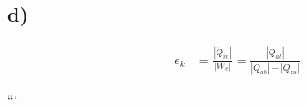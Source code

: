 

\subsection*{d)}
\begin{align*}
\epsilon_k &= \frac{\left| \dot{Q}_{in} \right|}{\left| W_e \right|} = \frac{\left| \dot{Q}_{ab} \right|}{\left| \dot{Q}_{ab} \right| - \left| Q_{zu} \right|}
\end{align*}

```